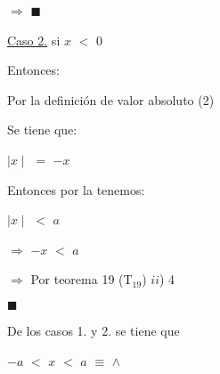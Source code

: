 \documentclass[12pt]{article}
\renewcommand{\qedsymbol}{$\blacksquare$}
\begin{document}
\hspace{3.5cm} $\Longrightarrow$ {}  \hspace{0.4cm} {\textcolor{carrotorange}{\qedsymbol}}   \vspace{0.5cm}
\newpage

{\textcolor{palatinateblue}{{\underline{Caso 2.}} }} si {\Large{$x$ $<$ $0$}}\vspace{0.5cm}

{\textcolor{palatinateblue}{Entonces:}} \vspace{0.5cm}

{\textcolor{carrotorange}{Por la definición de valor absoluto (2)}} \vspace{0.5cm}

{\textcolor{palatinateblue}{Se tiene que:}} \vspace{0.5cm}

\hspace{4.8cm} $\mid x \mid$ $=$ $-x$ \vspace{0.5cm}  

{\textcolor{palatinateblue}{Entonces por la {}}} {}  {\textcolor{palatinateblue}{tenemos:}}\vspace{0.5cm} 

\hspace{5cm} $\mid x \mid$ $<$ $a$ \vspace{0.5cm}

\hspace{4cm} $\Longrightarrow$ $ -x $ $<$ $a$ \vspace{0.5cm}

\hspace{4cm} $\Longrightarrow$ \hspace{0.2cm} {} \hspace{1.9cm} {\textcolor{carrotorange}{Por teorema 19 (T$_{19}$) $ii$) 4 }} \vspace{0.5cm}

\hspace{7cm} {\textcolor{carrotorange}{\qedsymbol}} 

{\textcolor{palatinateblue}{De los casos 1. y 2. se tiene que}} \vspace{0.5cm}

\hspace{4.4cm} $-a$  $<$ $x$ $<$ $a$ $\equiv$ {} $\wedge$ {} \vspace{2cm}
\end{document}

